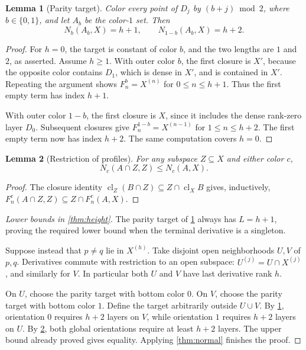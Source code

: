 \documentclass[11pt,letterpaper]{article}
\numberwithin{equation}{section}
\newtheorem{lemma}[lemma]{Lemma}
\theoremstyle{definition}
\theoremstyle{remark}
\theoremstyle{definition}
\newcommand{\cl}{\operatorname{cl}}
\begin{document}
\begin{lemma}[Parity target]\label{lem:parity}
Color every point of $D_j$ by $(b+j)\bmod2$, where $b\in\{0,1\}$, and let
$A_b$ be the color-$1$ set. Then
\begin{equation}\label{eq:parityprofiles}
 N_b(A_b,X)=h+1,\qquad N_{1-b}(A_b,X)=h+2.
\end{equation}
\end{lemma}
\begin{proof}
For $h=0$, the target is constant of color $b$, and the two lengths are
$1$ and $2$, as asserted. Assume $h\geq1$.
With outer color $b$, the first closure is $X'$, because the opposite color
contains $D_1$, which is dense in $X'$, and is contained in $X'$.
Repeating the argument shows $F^b_n=X^{(n)}$ for $0\leq n\leq h+1$.
Thus the first empty term has index $h+1$.

With outer color $1-b$, the first closure is $X$, since it includes the dense
rank-zero layer $D_0$. Subsequent closures give
$F^{1-b}_n=X^{(n-1)}$ for $1\leq n\leq h+2$. The first empty term now has
index $h+2$. The same computation covers $h=0$.
\end{proof}

\begin{lemma}[Restriction of profiles]\label{lem:profile-restrict}
For any subspace $Z\subseteq X$ and either color $c$,
\[
 N_c(A\cap Z,Z)\leq N_c(A,X).
\]
\end{lemma}
\begin{proof}
The closure identity
$\cl_Z(B\cap Z)\subseteq Z\cap\cl_X B$ gives, inductively,
$F^c_n(A\cap Z,Z)\subseteq Z\cap F^c_n(A,X)$.
\end{proof}

\begin{proof}[Lower bounds in \cref{thm:height}]
The parity target of \cref{lem:parity} always has $L=h+1$, proving the required
lower bound when the terminal derivative is a singleton.

Suppose instead that $p\ne q$ lie in $X^{(h)}$. Take disjoint open neighborhoods
$U,V$ of $p,q$. Derivatives commute with restriction to an open subspace:
$U^{(j)}=U\cap X^{(j)}$, and similarly for $V$. In particular both $U$ and $V$
have last derivative rank $h$.

On $U$, choose the parity target with bottom color $0$. On $V$, choose the parity
target with bottom color $1$. Define the target arbitrarily outside $U\cup V$.
By \cref{lem:parity}, orientation $0$ requires $h+2$ layers on $V$, while
orientation $1$ requires $h+2$ layers on $U$. By
\cref{lem:profile-restrict}, both global orientations require at least $h+2$
layers. The upper bound already proved gives equality. Applying
\cref{thm:normal} finishes the proof.
\end{proof}
\end{document}

